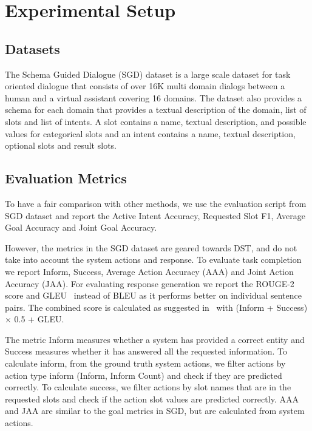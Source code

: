 \section{Experimental Setup}


\subsection{Datasets}

The Schema Guided Dialogue (SGD) dataset is a large scale dataset for task oriented dialogue that consists of over 16K multi domain
dialogs between a human and a virtual assistant covering 16 domains. The dataset also provides a schema for each domain that
provides a textual description of the domain, list of slots and list of intents. A slot contains a name, textual description,
and possible values for categorical slots and an intent contains a name, textual description, optional slots and result slots.

\subsection{Evaluation Metrics}

To have a fair comparison with other methods, we use the evaluation script from SGD dataset and report the Active Intent Accuracy,
Requested Slot F1, Average Goal Accuracy and Joint Goal Accuracy.

However, the metrics in the SGD dataset are geared towards DST, and do not take into account the system actions and response.
To evaluate task completion we report Inform, Success, Average Action Accuracy (AAA) and Joint Action Accuracy (JAA). For evaluating response
generation we report the ROUGE-2~\cite{lin2004looking} score and GLEU~\cite{wu2016googles} instead of BLEU as it performs better on individual sentence pairs.
The combined score is calculated as suggested in~\cite{mehri2019structured} with (Inform + Success) $\times$ 0.5 + GLEU.

The metric Inform measures whether a system has provided a correct entity and Success measures whether it has answered all the requested
information. To calculate inform, from the ground truth system actions, we filter actions by action type inform (Inform, Inform Count)
and check if they are predicted correctly. To calculate success, we filter actions by slot names that are in the requested slots and
check if the action slot values are predicted correctly. AAA and JAA are similar to the
goal metrics in SGD, but are calculated from system actions.
